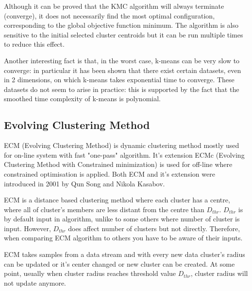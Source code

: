 \documentclass[conference]{IEEEtran}
\begin{document}
Although it can be proved that the KMC algorithm will always terminate (converge),
it does not necessarily find the most optimal configuration,
corresponding to the global objective function minimum. The algorithm is also sensitive
to the initial selected cluster centroids but it can be run multiple times to reduce this effect.

Another interesting fact is that, in the worst case, k-means can be very slow to converge:
in particular it has been shown that there exist certain datasets,
even in 2 dimensions, on which k-means takes exponential time to converge.
These datasets do not seem to arise in practice: this is supported by the
fact that the smoothed time complexity of k-means is polynomial.

\subsection{Evolving Clustering Method}

ECM (Evolving Clustering Method) is dynamic clustering method mostly used for on-line system with fast "one-pass" algorithm. It's extension ECMc (Evolving Clustering Method with Constrained minimization) is used for off-line where constrained optimisation is applied. Both ECM and it's extension were introduced in 2001 by Qun Song and Nikola Kasabov.

ECM is a distance based clustering method where each cluster has a centre, where all of cluster's members are less distant from the centre than $D_{thr}$. $D_{thr}$ is by default input in algorithm, unlike to some others where number of cluster is input. However, $D_{thr}$ does affect number of clusters but not directly. Therefore, when comparing ECM algorithm to others you have to be aware of their inputs.

ECM takes samples from a data stream and with every new data cluster's radius can be updated or it's center changed or new cluster can be created. At some point, usually when cluster radius reaches threshold value $D_{thr}$, cluster radius will not update anymore.
\end{document}
